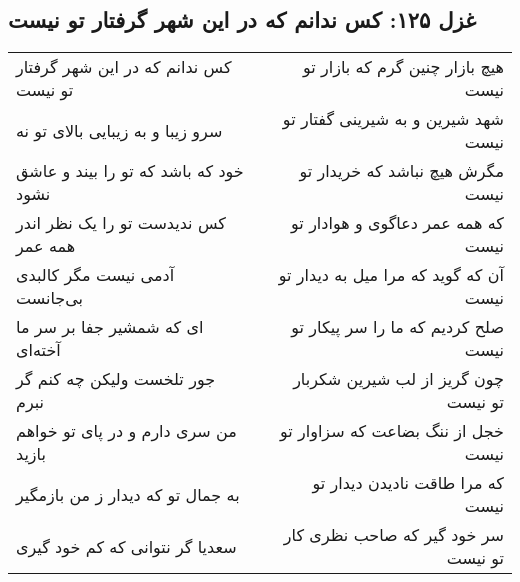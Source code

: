 \begin{center}
\section*{غزل ۱۲۵: کس ندانم که در این شهر گرفتار تو نیست}
\label{sec:125}
\begin{longtable}{l p{0.5cm} r}
کس ندانم که در این شهر گرفتار تو نیست
&&
هیچ بازار چنین گرم که بازار تو نیست
\\
سرو زیبا و به زیبایی بالای تو نه
&&
شهد شیرین و به شیرینی گفتار تو نیست
\\
خود که باشد که تو را بیند و عاشق نشود
&&
مگرش هیچ نباشد که خریدار تو نیست
\\
کس ندیدست تو را یک نظر اندر همه عمر
&&
که همه عمر دعاگوی و هوادار تو نیست
\\
آدمی نیست مگر کالبدی بی‌جانست
&&
آن که گوید که مرا میل به دیدار تو نیست
\\
ای که شمشیر جفا بر سر ما آخته‌ای
&&
صلح کردیم که ما را سر پیکار تو نیست
\\
جور تلخست ولیکن چه کنم گر نبرم
&&
چون گریز از لب شیرین شکربار تو نیست
\\
من سری دارم و در پای تو خواهم بازید
&&
خجل از ننگ بضاعت که سزاوار تو نیست
\\
به جمال تو که دیدار ز من بازمگیر
&&
که مرا طاقت نادیدن دیدار تو نیست
\\
سعدیا گر نتوانی که کم خود گیری
&&
سر خود گیر که صاحب نظری کار تو نیست
\\
\end{longtable}
\end{center}
